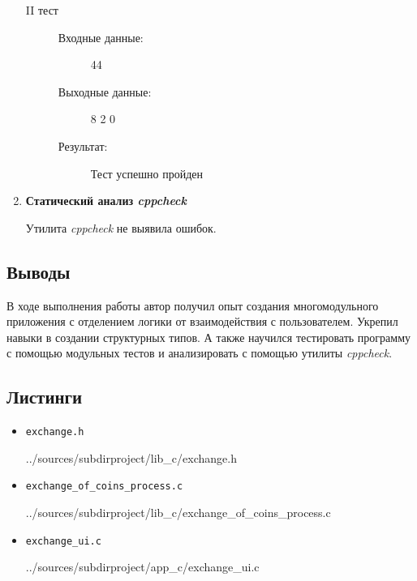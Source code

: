 \documentclass[12pt,a4paper]{report}
\begin{document}
\begin{enumerate}
\begin{description}
\item[II тест]
\hspace{\parindent}
\begin{flushleft}
\begin{description}
\item[Входные данные:] 44
\item[Выходные данные:] 8 2 0
\item[Результат:] Тест успешно пройден
\end{description}
\end{flushleft}
\end{description}

\item \textbf{Статический анализ \textit{cppcheck}}

Утилита \textit{cppcheck} не выявила ошибок.
\end{enumerate}
\subsection{Выводы}
\hspace{\parindent}
В ходе выполнения работы автор получил опыт создания многомодульного приложения с отделением логики от взаимодействия с пользователем. Укрепил навыки в создании структурных типов. А также научился тестировать программу с помощью модульных тестов и анализировать с помощью утилиты \textit{cppcheck}.
\subsection*{Листинги}
\begin{itemize}
\item[] \verb-exchange.h-

{../sources/subdirproject/lib_c/exchange.h}
\item[] \verb-exchange_of_coins_process.c-

{../sources/subdirproject/lib_c/exchange_of_coins_process.c}
\item[] \verb-exchange_ui.c-

{../sources/subdirproject/app_c/exchange_ui.c}
\end{itemize}

%
\end{document}
